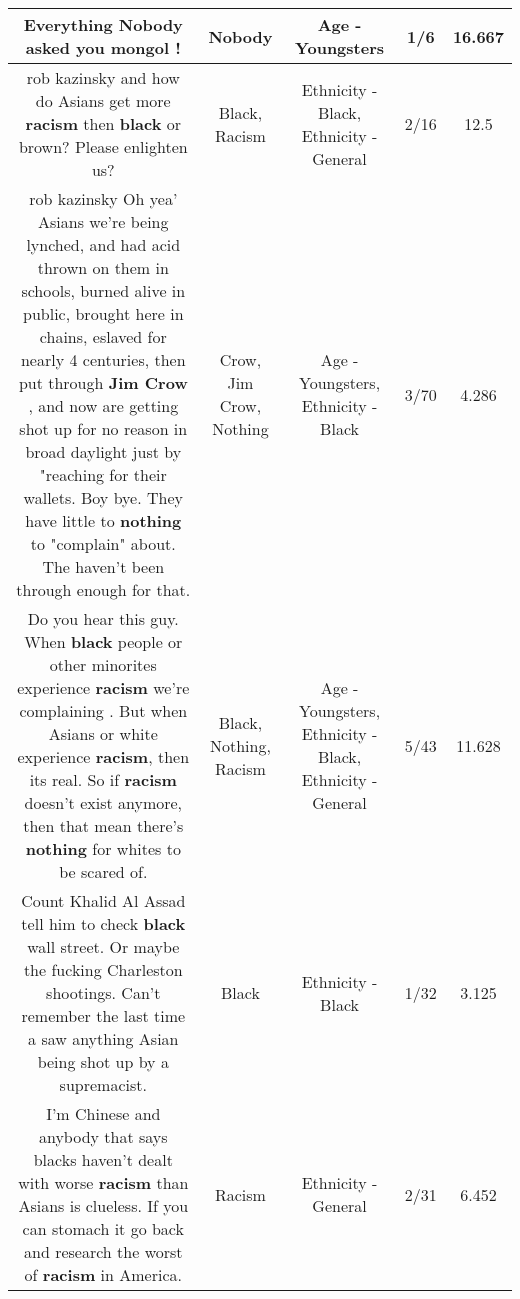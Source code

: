 \documentclass[11pt]{article}
\newlength\mylength
\begin{document}
\begin{center}
\begin{longtable}{|C{.65\mylength}|C{.30\mylength}|C{.12\mylength}|C{.12\mylength}|C{.12\mylength}|}
  \small Everything \textbf{Nobody} asked you mongol !\normalsize   & Nobody & Age - Youngsters & 1/6 & 16.667 \\  \hline
  \small rob kazinsky and how do Asians get more \textbf{racism} then \textbf{black} or brown? Please enlighten us?\normalsize   & Black, Racism & Ethnicity - Black, Ethnicity - General & 2/16 & 12.5 \\  \hline
  \small rob kazinsky Oh yea' Asians we're being lynched, and had acid thrown on them in schools, burned alive in public, brought here in chains, eslaved for nearly 4 centuries, then put through \textbf{Jim C\textbf{row}} , and now are getting shot up for no reason in broad daylight just by "reaching for their wallets. Boy bye. They have little to \textbf{nothing} to "complain" about. The haven't been through enough for that.\normalsize   & Crow, Jim Crow, Nothing & Age - Youngsters, Ethnicity - Black & 3/70 & 4.286 \\  \hline
  \small Do you hear this guy. When \textbf{black} people or other minorites experience \textbf{racism} we're complaining . But when Asians or white experience \textbf{racism}, then its real. So if \textbf{racism} doesn't exist anymore, then that mean there's \textbf{nothing} for whites to be scared of.\normalsize   & Black, Nothing, Racism & Age - Youngsters, Ethnicity - Black, Ethnicity - General & 5/43 & 11.628 \\  \hline
  \small Count Khalid Al Assad tell him to check \textbf{black} wall street. Or maybe the fucking Charleston shootings. Can't remember the last time a saw anything Asian being shot up by a supremacist.\normalsize   & Black & Ethnicity - Black & 1/32 & 3.125 \\  \hline
  \small I'm  Chinese and anybody that says blacks haven't  dealt with worse \textbf{racism} than Asians  is clueless. If you can stomach it go back and research the worst of \textbf{racism} in America.\normalsize   & Racism & Ethnicity - General & 2/31 & 6.452 \\  \hline

\end{longtable}
\end{center}
\end{document}
